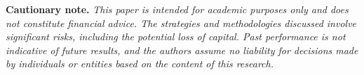 %
%




\textbf{Cautionary note.} 
\textit{
This paper is intended for academic %
purposes only and does not constitute financial advice. The strategies and methodologies discussed involve significant risks, including the potential loss of capital. Past performance is not indicative of future results, and the authors assume no liability for decisions made by individuals or entities based on the content of this research. 
}